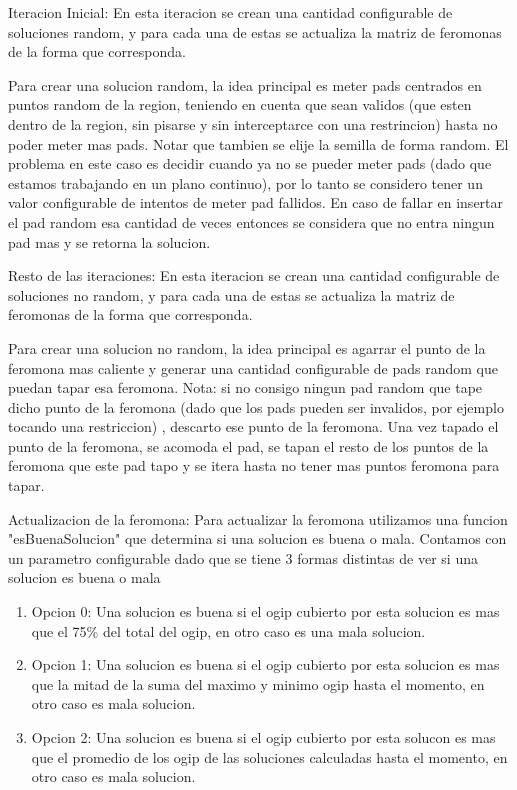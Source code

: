 Iteracion Inicial: En esta iteracion se crean una cantidad configurable de soluciones random, y para cada una de estas se actualiza la matriz de feromonas de la forma que corresponda. 

Para crear una solucion random, la idea principal es meter pads centrados en puntos random de la region, teniendo en cuenta que sean validos (que esten dentro de la region, sin pisarse y sin interceptarce con una restrincion) hasta no poder meter mas pads. Notar que tambien se elije la semilla de forma random. El problema en este caso es decidir cuando ya no se pueder meter pads (dado que estamos trabajando en un plano continuo), por lo tanto se considero tener un valor configurable de intentos de meter pad fallidos. En caso de fallar en insertar el pad random esa cantidad de veces entonces se considera que no entra ningun pad mas y se retorna la solucion.

Resto de las iteraciones: En esta iteracion se crean una cantidad configurable de soluciones no random, y para cada una de estas se actualiza la matriz de feromonas de la forma que corresponda.

Para crear una solucion no random, la idea principal es agarrar el punto de la feromona mas caliente y generar una cantidad configurable de pads random que puedan tapar esa feromona. Nota: si no consigo ningun pad random que tape dicho punto de la feromona (dado que los pads pueden ser invalidos, por ejemplo tocando una restriccion) , descarto ese punto de la feromona. 
Una vez tapado el punto de la feromona, se acomoda el pad, se tapan el resto de los puntos de la feromona que este pad tapo y se itera hasta no tener mas puntos feromona para tapar. 

Actualizacion de la feromona: Para actualizar la feromona utilizamos una funcion "esBuenaSolucion" que determina si una solucion es buena o mala. Contamos con un parametro configurable dado que se tiene 3 formas distintas de ver si una solucion es buena o mala

\begin{enumerate}
\item Opcion 0: Una solucion es buena si el ogip cubierto por esta solucion es mas que el 75\% del total del ogip, en otro caso es una mala solucion.
\item Opcion 1: Una solucion es buena si el ogip cubierto por esta solucion es mas que la mitad de la suma del maximo y minimo ogip hasta el momento, en otro caso es mala solucion.
\item Opcion 2: Una solucion es buena si el ogip cubierto por esta solucon es mas que el promedio de los ogip de las soluciones calculadas hasta el momento, en otro caso es mala solucion. 
\end{enumerate}

